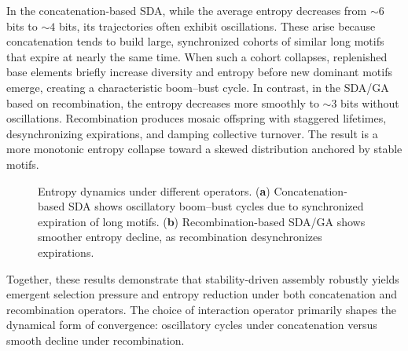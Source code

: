 \documentclass[life,article,submit,pdftex,moreauthors]{Definitions/mdpi}
\begin{document}
In the concatenation-based SDA, while the average entropy decreases from $\sim6$ bits to $\sim4$ bits, its trajectories often exhibit oscillations. These arise because concatenation tends to build large, synchronized cohorts of similar long motifs that expire at nearly the same time. When such a cohort collapses, replenished base elements briefly increase diversity and entropy before new dominant motifs emerge, creating a characteristic boom–bust cycle. In contrast, in the SDA/GA based on recombination, the entropy decreases more smoothly to $\sim3$ bits without oscillations. Recombination produces mosaic offspring with staggered lifetimes, desynchronizing expirations, and damping collective turnover. The result is a more monotonic entropy collapse toward a skewed distribution anchored by stable motifs.

\begin{figure}[H]
\centering
{}
\hfill
{}
\caption{Entropy dynamics under different operators. (\textbf{a}) Concatenation-based SDA shows oscillatory boom–bust cycles due to synchronized expiration of long motifs. (\textbf{b}) Recombination-based SDA/GA shows smoother entropy decline, as recombination desynchronizes expirations.}
\label{fig:entropy-comparison}
\end{figure}


Together, these results demonstrate that stability-driven assembly robustly yields emergent selection pressure and entropy reduction under both concatenation and recombination operators. The choice of interaction operator primarily shapes the dynamical form of convergence: oscillatory cycles under concatenation versus smooth decline under recombination.
\end{document}
